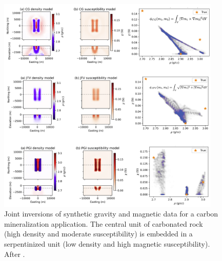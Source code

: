 \begin{figure}[!htb]
    \begin{center}
    \includegraphics[width=0.95\textwidth]{figures/joint-inversion.png}
    \end{center}
\caption{
    Joint inversions of synthetic gravity and magnetic data for a carbon mineralization application. The central unit of carbonated rock (high density and moderate susceptibility) is embedded in a serpentinized unit (low density and high magnetic susceptibility). After \citep{capriotti_joint_2023}.
}
\label{fig:joint-inversion}
\end{figure}
